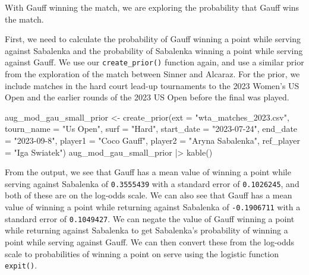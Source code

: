 \documentclass[
  letterpaper,
  DIV=11,
  numbers=noendperiod]{scrartcl}
\newenvironment{Shaded}{\begin{snugshade}}{\end{snugshade}}
\newcommand{\AttributeTok}[1]{\textcolor[rgb]{0.40,0.45,0.13}{#1}}
\newcommand{\FunctionTok}[1]{\textcolor[rgb]{0.28,0.35,0.67}{#1}}
\newcommand{\NormalTok}[1]{\textcolor[rgb]{0.00,0.23,0.31}{#1}}
\newcommand{\OtherTok}[1]{\textcolor[rgb]{0.00,0.23,0.31}{#1}}
\newcommand{\SpecialCharTok}[1]{\textcolor[rgb]{0.37,0.37,0.37}{#1}}
\newcommand{\StringTok}[1]{\textcolor[rgb]{0.13,0.47,0.30}{#1}}
\begin{document}
With Gauff winning the match, we are exploring the probability that
Gauff wins the match.

First, we need to calculate the probability of Gauff winning a point
while serving against Sabalenka and the probability of Sabalenka winning
a point while serving against Gauff. We use our \texttt{create\_prior()}
function again, and use a similar prior from the exploration of the
match between Sinner and Alcaraz. For the prior, we include matches in
the hard court lead-up tournaments to the 2023 Women's US Open and the
earlier rounds of the 2023 US Open before the final was played.

\linespread{0.9}

\begin{Shaded}
\begin{Highlighting}[]
\NormalTok{aug\_mod\_gau\_small\_prior }\OtherTok{\textless{}{-}} \FunctionTok{create\_prior}\NormalTok{(}\AttributeTok{ext =} \StringTok{"wta\_matches\_2023.csv"}\NormalTok{,}
                         \AttributeTok{tourn\_name =} \StringTok{"Us Open"}\NormalTok{,}
                         \AttributeTok{surf =} \StringTok{"Hard"}\NormalTok{,}
                         \AttributeTok{start\_date =} \StringTok{"2023{-}07{-}24"}\NormalTok{,}
                         \AttributeTok{end\_date =} \StringTok{"2023{-}09{-}8"}\NormalTok{,}
                         \AttributeTok{player1 =} \StringTok{"Coco Gauff"}\NormalTok{,}
                         \AttributeTok{player2 =} \StringTok{"Aryna Sabalenka"}\NormalTok{,}
                         \AttributeTok{ref\_player =} \StringTok{"Iga Swiatek"}\NormalTok{)}
\NormalTok{aug\_mod\_gau\_small\_prior }\SpecialCharTok{|\textgreater{}} \FunctionTok{kable}\NormalTok{()}
\end{Highlighting}
\end{Shaded}

\linespread{2}

From the output, we see that Gauff has a mean value of winning a point
while serving against Sabalenka of \texttt{0.3555439} with a standard
error of \texttt{0.1026245}, and both of these are on the log-odds
scale. We can also see that Gauff has a mean value of winning a point
while returning against Sabalenka of \texttt{-0.1906711} with a standard
error of \texttt{0.1049427}. We can negate the value of Gauff winning a
point while returning against Sabalenka to get Sabalenka's probability
of winning a point while serving against Gauff. We can then convert
these from the log-odds scale to probabilities of winning a point on
serve using the logistic function \texttt{expit()}.
\end{document}
